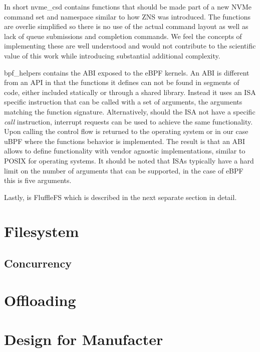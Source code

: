 In short nvme\_csd contains functions that should be made part of a new NVMe
command set and namespace \cite{nvme-command} similar to how ZNS was introduced.
The functions are overlie simplified so there is no use of the actual command
layout as well as lack of queue submissions and completion commands. We feel
the concepts of implementing these are well understood and would not contribute
to the scientific value of this work while introducing substantial additional
complexity.

bpf\_helpers contains the ABI exposed to the eBPF kernels. An ABI is different
from an API in that the functions it defines can not be found in segments of
code, either included statically or through a shared library. Instead it uses
an ISA specific instruction that can be called with a set of arguments, the
arguments matching the function signature. Alternatively, should the ISA not
have a specific \textit{call} instruction, interrupt requests can be used to
achieve the same functionality. Upon calling the control flow is returned to
the operating system or in our case uBPF where the functions behavior is
implemented. The result is that an ABI allows to define functionality with
vendor agnostic implementations, similar to POSIX for operating systems. It
should be noted that ISAs typically have a hard limit on the number of arguments
that can be supported, in the case of eBPF this is five arguments.

Lastly, is FluffleFS which is described in the next separate section in detail.

\section{Filesystem}


\subsection{Concurrency}

\section{Offloading}


\section{Design for Manufacter}


